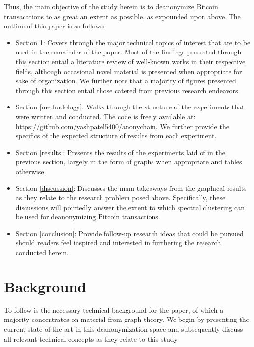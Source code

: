 \documentclass{article}
\begin{document}
Thus, the main objective of the study herein is to deanonymize Bitcoin transacations to as great an extent as possible, as expounded upon above. The outline of this paper is as follows:
\begin{itemize}
    \item Section \ref{background}: Covers through the major technical topics of interest that are to be used in the remainder of the paper. Most of the findings presented through this section entail a literature review of well-known works in their respective fields, although occasional novel material is presented when appropriate for sake of organization. We further note that a majority of figures presented through this section entail those catered from previous research endeavors.
    \item Section \ref{methodology}: Walks through the structure of the experiments that were written and conducted. The code is freely available at: \url{https://github.com/yashpatel5400/anonychain}. We further provide the specifics of the expected structure of results from each experiment.
    \item Section \ref{results}: Presents the results of the experiments laid of in the previous section, largely in the form of graphs when appropriate and tables otherwise.
    \item Section \ref{discussion}: Discusses the main takeaways from the graphical results as they relate to the research problem posed above. Specifically, these discussions will pointedly answer the extent to which spectral clustering can be used for deanonymizing Bitcoin transactions.
    \item Section \ref{conclusion}: Provide follow-up research ideas that could be pursued should readers feel inspired and interested in furthering the research conducted herein.
\end{itemize}

\clearpage
\section{Background}\label{background}
To follow is the necessary technical background for the paper, of which a majority concentrates on material from graph theory. We begin by presenting the current state-of-the-art in this deanonymization space and subsequently discuss all relevant technical concepts as they relate to this study. 
\end{document}
